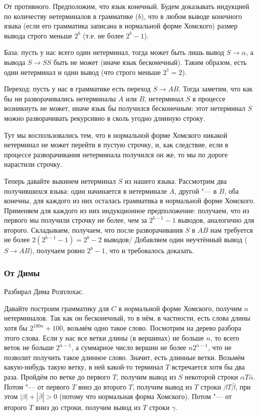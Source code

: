 		От противного.
		Предположим, что язык конечный.
		Будем доказывать индукцией по количеству нетерминалов в грамматике ($b$), что в любом выводе конечного языка
		(если его грамматика записана в нормальной форме Хомского) размер вывода строго меньше $2^b$ (т.е. не более $2^b-1$).

		База: пусть у нас всего один нетерминал, тогда может быть лишь вывод $S\to \alpha$,
		а вывода $S \to SS$ быть не может (иначе язык бесконечный).
		Таким образом, есть один нетерминал и один вывод (что строго меньше $2^1=2$).

		Переход: пусть у нас в грамматике есть переход $S \to AB$.
		Тогда заметим, что как бы ни разворачивались нетерминалы $A$ или $B$, нетерминал $S$ в процессе возникнуть не может,
		иначе язык бы получился бесконечным: этот нетерминал $S$ можно разворачивать рекурсивно в сколь угодно длинную строку.
		\begin{Rem}
			Тут мы воспользовались тем, что в нормальной форме Хомского никакой нетерминал не может перейти в пустую строчку,
			и, как следствие, если в процессе разворачивания нетерминала получился он же, то мы по дороге нарастили строчку.
		\end{Rem}
		Теперь давайте выкинем нетерминал $S$ из нашего языка.
		Рассмотрим два получившихся языка: один начинается в нетерминале $A$, другой "--- в $B$, оба конечны,
		для каждого из них осталась грамматика в нормальной форме Хомского.
		Применяем для каждого из них индукционное предположение: получаем, что из первого мы получили строчку не более, чем за $2^{b-1}-1$ выводов, аналогично для второго.
		Складываем, получаем, что после разворачивания $S$ в $AB$ нам требуется не более $2(2^{b-1}-1)=2^b-2$ выводов/
		Добавляем один неучтённый вывод ($S \to AB$), получаем ровно $2^b-1$, что и требовалось доказать.

	\subsubsection{От Димы}
		Разбирал Дима Розплохас.

		Давайте построим грамматику для $C$ в нормальной форме Хомского, получим $n$ нетерминалов.
		Так как он бесконечный, то в нём, в частности, есть слова длины хотя бы $2^{100n}+100$, возьмём одно такое слово.
		Посмотрим на дерево разбора этого слова.
		Если у нас все ветки длины (в вершинах) не больше $n$, то всего веток не больше $2^{n-1}$, а
		суммарное число вершин не более $n2^{n-1}$, что не позволит получить такое длинное слово.
		Значит, есть длинные ветки.
		Возьмём какую-нибудь такую ветку, в ней какой-то терминал $T$ встречается хотя бы два раза.
		Пройдём по ветке до первого $T$, получим вывод из $S$ некоторой строки $\alpha T \bar\alpha$.
		Потом "--- от первого $T$ вниз до второго $T$, получим вывод из $T$ строки $\beta T \bar\beta$,
		при этом $|\beta| + |\bar\beta| > 0$ (потому что нормальная форма Хомского).
		Потом "--- от второго $T$ вниз до строки, получим вывод из $T$ строки $\gamma$.

